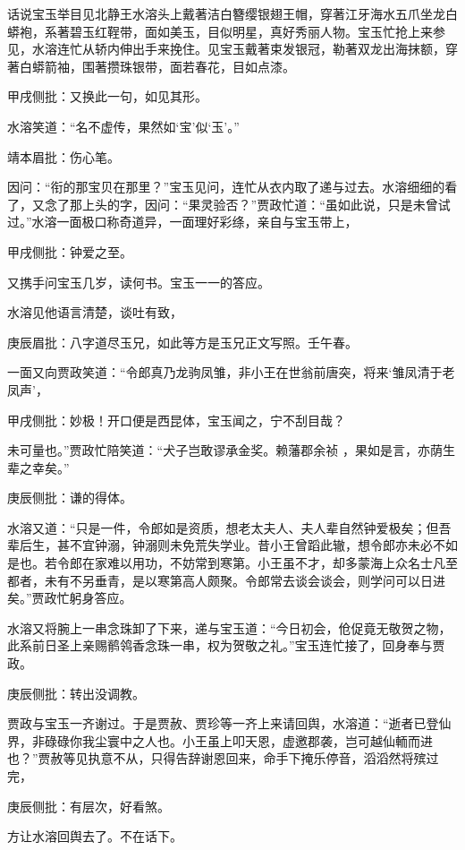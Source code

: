 \begin{parag}

    话说宝玉举目见北静王水溶头上戴著洁白簪缨银翅王帽，穿著江牙海水五爪坐龙白蟒袍，系著碧玉红鞓带，面如美玉，目似明星，真好秀丽人物。宝玉忙抢上来参见，水溶连忙从轿内伸出手来挽住。见宝玉戴著束发银冠，勒著双龙出海抹额，穿著白蟒箭袖，围著攒珠银带，面若春花，目如点漆。\begin{note}甲戌侧批：又换此一句，如见其形。\end{note}水溶笑道：“名不虚传，果然如‘宝’似‘玉’。”\begin{note}靖本眉批：伤心笔。\end{note}因问：“衔的那宝贝在那里？”宝玉见问，连忙从衣内取了递与过去。水溶细细的看了，又念了那上头的字，因问：“果灵验否？”贾政忙道：“虽如此说，只是未曾试过。”水溶一面极口称奇道异，一面理好彩绦，亲自与宝玉带上，\begin{note}甲戌侧批：钟爱之至。\end{note}又携手问宝玉几岁，读何书。宝玉一一的答应。
\end{parag}


\begin{parag}


    水溶见他语言清楚，谈吐有致，\begin{note}庚辰眉批：八字道尽玉兄，如此等方是玉兄正文写照。壬午春。\end{note}一面又向贾政笑道：“令郎真乃龙驹凤雏，非小王在世翁前唐突，将来‘雏凤清于老凤声’，\begin{note}甲戌侧批：妙极！开口便是西昆体，宝玉闻之，宁不刮目哉？\end{note}未可量也。”贾政忙陪笑道：“犬子岂敢谬承金奖。赖藩郡余祯 ，果如是言，亦荫生辈之幸矣。”\begin{note}庚辰侧批：谦的得体。\end{note}水溶又道：“只是一件，令郎如是资质，想老太夫人、夫人辈自然钟爱极矣；但吾辈后生，甚不宜钟溺，钟溺则未免荒失学业。昔小王曾蹈此辙，想令郎亦未必不如是也。若令郎在家难以用功，不妨常到寒第。小王虽不才，却多蒙海上众名士凡至都者，未有不另垂青，是以寒第高人颇聚。令郎常去谈会谈会，则学问可以日进矣。”贾政忙躬身答应。
\end{parag}


\begin{parag}


    水溶又将腕上一串念珠卸了下来，递与宝玉道：“今日初会，伧促竟无敬贺之物，此系前日圣上亲赐鹡鸰香念珠一串，权为贺敬之礼。”宝玉连忙接了，回身奉与贾政。\begin{note}庚辰侧批：转出没调教。\end{note}贾政与宝玉一齐谢过。于是贾赦、贾珍等一齐上来请回舆，水溶道：“逝者已登仙界，非碌碌你我尘寰中之人也。小王虽上叩天恩，虚邀郡袭，岂可越仙輀而进也？”贾赦等见执意不从，只得告辞谢恩回来，命手下掩乐停音，滔滔然将殡过完，\begin{note}庚辰侧批：有层次，好看煞。\end{note}方让水溶回舆去了。不在话下。
\end{parag}


